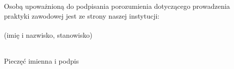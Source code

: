 \documentclass[11pt,a4paper]{article}
\begin{document}
\noindent Osobą upoważnioną do podpisania porozumienia dotyczącego prowadzenia praktyki zawodowej jest ze strony naszej instytucji: \\[1em]
\dotfill \\
{\small (imię i nazwisko, stanowisko)}

\vspace{5em}

\begin{flushright}
    \begin{minipage}{6cm}
        \centering
        \dotfill \\
        {\small Pieczęć imienna i podpis}
    \end{minipage}
\end{flushright}
\end{document}

